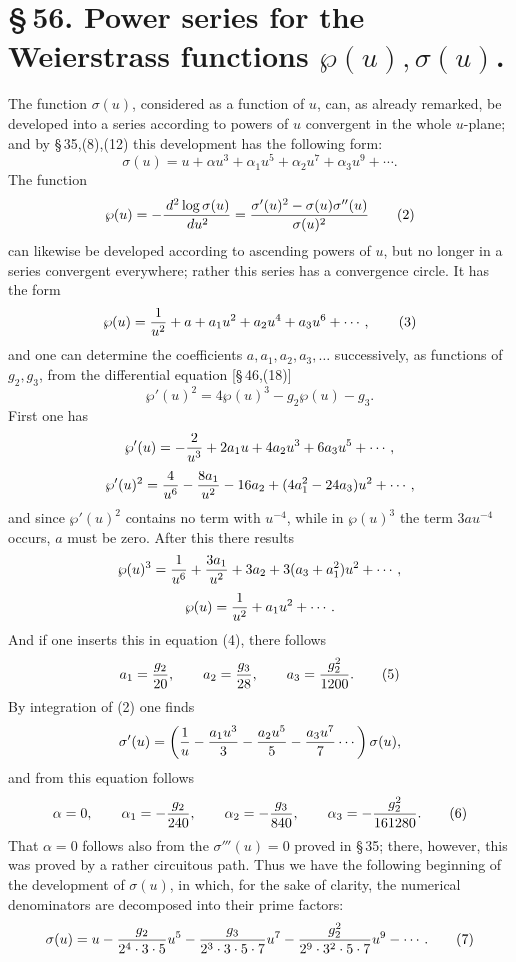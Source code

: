 \documentclass[11pt]{article}
\providecommand{\dd}{\,d}
\begin{document}
\section*{\S\,56. Power series for the Weierstrass functions $\wp(u),\sigma(u)$.}

The function $\sigma(u)$, considered as a function of $u$, can, as already remarked, be developed into a series according to powers of $u$ convergent in the whole $u$-plane; and by \S\,35,(8),(12) this development has the following form:
\begin{equation}
\sigma(u)=u+\alpha u^3+\alpha_1u^5+\alpha_2u^7+\alpha_3u^9+\cdots.
\tag{1}
\end{equation}
The function
\begin{equation}
\wp(u)=-{\dd^2\log\sigma(u)\over\dd u^2}
={\sigma'(u)^2-\sigma(u)\sigma''(u)\over\sigma(u)^2}
\tag{2}
\end{equation}
can likewise be developed according to ascending powers of $u$, but no longer in a series convergent everywhere; rather this series has a convergence circle. It has the form
\begin{equation}
\wp(u)={1\over u^2}+a+a_1u^2+a_2u^4+a_3u^6+\cdots,
\tag{3}
\end{equation}
and one can determine the coefficients $a,a_1,a_2,a_3,\ldots$ successively, as functions of $g_2,g_3$, from the differential equation [\S\,46,(18)]
\begin{equation}
\wp'(u)^2=4\wp(u)^3-g_2\wp(u)-g_3.
\tag{4}
\end{equation}
First one has
\[
\wp'(u)=-{2\over u^3}+2a_1u+4a_2u^3+6a_3u^5+\cdots,
\]
\[
\wp'(u)^2={4\over u^6}-{8a_1\over u^2}-16a_2+(4a_1^2-24a_3)u^2+\cdots,
\]
and since $\wp'(u)^2$ contains no term with $u^{-4}$, while in $\wp(u)^3$ the term $3au^{-4}$ occurs, $a$ must be zero. After this there results
\[
\wp(u)^3={1\over u^6}+{3a_1\over u^2}+3a_2+3(a_3+a_1^2)u^2+\cdots,
\]
\[
\wp(u)={1\over u^2}+a_1u^2+\cdots.
\]
And if one inserts this in equation (4), there follows
\begin{equation}
a_1={g_2\over20},
\qquad
a_2={g_3\over28},
\qquad
a_3={g_2^2\over1200}.
\tag{5}
\end{equation}
By integration of (2) one finds
\[
\sigma'(u)=\left({1\over u}-{a_1u^3\over3}-{a_2u^5\over5}-{a_3u^7\over7}\cdots\right)\sigma(u),
\]
and from this equation follows
\begin{equation}
\alpha=0,
\qquad
\alpha_1=-{g_2\over240},
\qquad
\alpha_2=-{g_3\over840},
\qquad
\alpha_3=-{g_2^2\over161280}.
\tag{6}
\end{equation}
That $\alpha=0$ follows also from the $\sigma'''(u)=0$ proved in \S\,35; there, however, this was proved by a rather circuitous path. Thus we have the following beginning of the development of $\sigma(u)$, in which, for the sake of clarity, the numerical denominators are decomposed into their prime factors:
\begin{equation}
\sigma(u)=u-{g_2\over2^4\cdot3\cdot5}u^5
-{g_3\over2^3\cdot3\cdot5\cdot7}u^7
-{g_2^2\over2^9\cdot3^2\cdot5\cdot7}u^9-\cdots.
\tag{7}
\end{equation}
\end{document}

